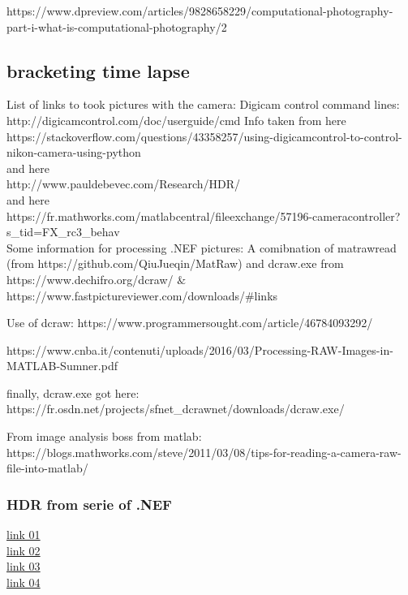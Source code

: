 \documentclass[twocolumn,amsmath,amssymb,floatfix]{article}
\begin{document}
https://www.dpreview.com/articles/9828658229/computational-photography-part-i-what-is-computational-photography/2

\subsection{bracketing time lapse}

List of links to took pictures with the camera:
Digicam control command lines: http://digicamcontrol.com/doc/userguide/cmd 
Info taken from here\\ https://stackoverflow.com/questions/43358257/using-digicamcontrol-to-control-nikon-camera-using-python \\ 
and here \\
http://www.pauldebevec.com/Research/HDR/  \\
and here\\
https://fr.mathworks.com/matlabcentral/fileexchange/57196-cameracontroller?s_tid=FX_rc3_behav \\

Some information for processing .NEF pictures:
A comibnation of matrawread (from https://github.com/QiuJueqin/MatRaw) and dcraw.exe from https://www.dechifro.org/dcraw/
$\&$ https://www.fastpictureviewer.com/downloads/#links

Use of dcraw: https://www.programmersought.com/article/46784093292/

https://www.cnba.it/contenuti/uploads/2016/03/Processing-RAW-Images-in-MATLAB-Sumner.pdf

finally, dcraw.exe got here: https://fr.osdn.net/projects/sfnet_dcrawnet/downloads/dcraw.exe/

From image analysis boss from matlab:
https://blogs.mathworks.com/steve/2011/03/08/tips-for-reading-a-camera-raw-file-into-matlab/


\subsubsection{HDR from serie of .NEF}

\noindent \href{https://pypi.org/project/rawhdr/}{link 01}\\
\noindent \href{https://github.com/fthaler/rawhdr}{link 02}\\
\noindent \href{https://learnopencv.com/high-dynamic-range-hdr-imaging-using-opencv-cpp-python/}{link 03}\\
\noindent \href{https://stackoverflow.com/questions/30010227/how-could-i-get-the-raw-pixel-data-out-of-a-nef-file-using-python}{link 04}\\
\end{document}

